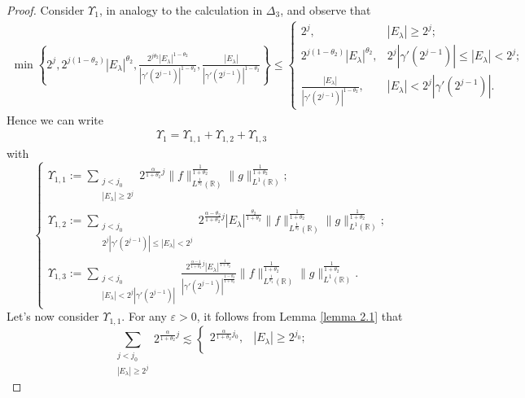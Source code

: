 \documentclass[11pt, twoside, leqno]{article}
\theoremstyle{definition}
\numberwithin{equation}{section}
\begin{document}
\begin{proof}
Consider $\Upsilon_1$, in analogy to the calculation in $\Delta_{3}$, and observe that
\begin{align*}
 \min\left\{2^j,2^{j(1-\theta_{2})}|E_{\lambda}|^{\theta_{2}},{\frac{2^{j\theta_2}|E_{\lambda}|^{1-\theta_{2}}}{|\gamma'(2^{j-1})|^{1-\theta_{2}}}} ,{\frac{|E_{\lambda}|}{|\gamma'(2^{j-1})|^{1-\theta_{2}}}}\right\}\leq
 \begin{cases}
   2^j, &  |E_{\lambda}|\geq 2^j; \\
    2^{j(1-\theta_{2})}|E_{\lambda}|^{\theta_{2}}, &  2^j{|\gamma'(2^{j-1})|}\leq|E_{\lambda}|<  2^j; \\
   {\frac{|E_{\lambda}|}{|\gamma'(2^{j-1})|^{1-\theta_{2}}}}, & |E_{\lambda}|<2^j|\gamma'(2^{j-1})|.
 \end{cases}
 \end{align*}
Hence we can write
\begin{align*}
 \Upsilon_{1}=\Upsilon_{1,1}+\Upsilon_{1,2}+\Upsilon_{1,3}
 \end{align*}
with
$$\begin{cases}
   \Upsilon_{1,1}:=\sum\limits_{  \substack{j<j_{0}   \\ |E_{\lambda}|\geq2^j }}
   2^{{\frac{\alpha}{1+\theta_{2}}j}}\|f\|^{\frac{1}{1+\theta_2}}_{L^{\frac{1}{\theta_2}}(\mathbb{R})}\|g\|^{\frac{1}{1+\theta_2}}_{L^{1}(\mathbb{R})}; \\
  \Upsilon_{1,2}:=\sum\limits_{  \substack{j<j_{0}   \\ 2^j{|\gamma'(2^{j-1})|}\leq|E_{\lambda}|<2^j }} 2^{{\frac{\alpha-\theta_{2}}{1+\theta_{2}}}j}|E_\lambda|^{\frac{\theta_{2}}{1+\theta_{2}}}\|f\|^{\frac{1}{1+\theta_2}}_{L^{\frac{1}{\theta_2}}(\mathbb{R})}\|g\|^{\frac{1}{1+\theta_2}}_{L^{1}(\mathbb{R})}; \\
 \Upsilon_{1,3}:=\sum\limits_{  \substack{j<j_{0}   \\ |E_{\lambda}|<2^j|\gamma'(2^{j-1})| }} \frac{2^{{\frac{\alpha-1}{1+\theta_{2}}j}}|E_\lambda|^{\frac{1}{1+\theta_{2}}}}{|\gamma'(2^{j-1})|^{\frac{1-\theta_{2}}{1+\theta_{2}}}}\|f\|^{\frac{1}{1+\theta_2}}_{L^{\frac{1}{\theta_2}}(\mathbb{R})}\|g\|^{\frac{1}{1+\theta_2}}_{L^{1}(\mathbb{R})}.
 \end{cases}$$
Let's now consider $\Upsilon_{1,1}$. For any $\varepsilon>0$, it follows from Lemma \ref{lemma 2.1} that
$$\sum\limits_{  \substack{j<j_{0}   \\ |E_{\lambda}|\geq2^j }}
   2^{{\frac{\alpha}{1+\theta_{2}}j}}\lesssim
\begin{cases}
  2^{\frac{\alpha}{1+\theta_{2}}j_0}, & |E_\lambda|\geq2^{j_0}; \\

\end{cases}$$
\end{proof}
\end{document}
